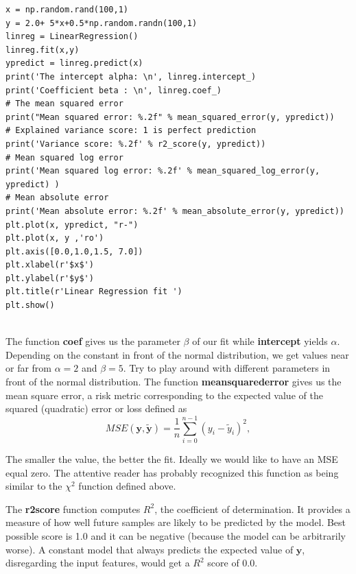 \documentclass{beamer}
\begin{document}
\begin{frame}
\begin{verbatim}
x = np.random.rand(100,1)
y = 2.0+ 5*x+0.5*np.random.randn(100,1)
linreg = LinearRegression()
linreg.fit(x,y)
ypredict = linreg.predict(x)
print('The intercept alpha: \n', linreg.intercept_)
print('Coefficient beta : \n', linreg.coef_)
# The mean squared error                               
print("Mean squared error: %.2f" % mean_squared_error(y, ypredict))
# Explained variance score: 1 is perfect prediction                                 
print('Variance score: %.2f' % r2_score(y, ypredict))
# Mean squared log error                                                        
print('Mean squared log error: %.2f' % mean_squared_log_error(y, ypredict) )
# Mean absolute error                                                           
print('Mean absolute error: %.2f' % mean_absolute_error(y, ypredict))
plt.plot(x, ypredict, "r-")
plt.plot(x, y ,'ro')
plt.axis([0.0,1.0,1.5, 7.0])
plt.xlabel(r'$x$')
plt.ylabel(r'$y$')
plt.title(r'Linear Regression fit ')
plt.show()


\end{verbatim}

The function \textbf{coef} gives us the parameter $\beta$ of our fit while \textbf{intercept} yields 
$\alpha$. Depending on the constant in front of the normal distribution, we get values near or far from $\alpha =2$ and $\beta =5$. Try to play around with different parameters in front of the normal distribution. The function \textbf{meansquarederror} gives us the mean square error, a risk metric corresponding to the expected value of the squared (quadratic) error or loss defined as
\[ MSE(\bm{y},\bm{\tilde{y}}) = \frac{1}{n}
\sum_{i=0}^{n-1}(y_i-\tilde{y}_i)^2, 
\] 

The smaller the value, the better the fit. Ideally we would like to
have an MSE equal zero.  The attentive reader has probably recognized
this function as being similar to the $\chi^2$ function defined above.

The \textbf{r2score} function computes $R^2$, the coefficient of
determination. It provides a measure of how well future samples are
likely to be predicted by the model. Best possible score is 1.0 and it
can be negative (because the model can be arbitrarily worse). A
constant model that always predicts the expected value of $\bm{y}$,
disregarding the input features, would get a $R^2$ score of $0.0$.


\end{frame}
\end{document}
